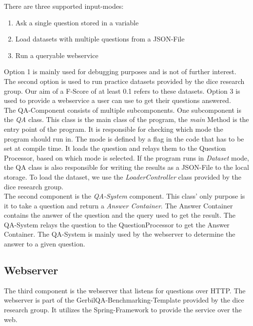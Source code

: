 \documentclass[runningheads]{llncs}
\begin{document}
There are three supported input-modes:  

\begin{enumerate}
	\item Ask a single question stored in a variable
	\item Load datasets with multiple questions from a JSON-File 
	\item Run a queryable webservice 
\end{enumerate}

Option 1 is mainly used for debugging purposes and is not of further interest. The second option is used to run practice datasets provided by the dice research group. Our aim of a F-Score of at least 0.1 refers to these datasets. Option 3 is used to provide a webservice a user can use to get their questions answered. \\

The QA-Component consists of multiple subcomponents. One subcomponent is the \emph{QA} class. This class is the main class of the program, the \emph{main} Method is the entry point of the program. It is responsible for checking which mode the program should run in. The mode is defined by a flag in the code that has to be set at compile time. It loads the question and relays them to the Question Processor, based on which mode is selected. If the program runs in \emph{Dataset} mode, the QA class is also responsible for writing the results as a JSON-File to the local storage. To load the dataset, we use the \emph{LoaderController} class provided by the dice research group. \\

The second component is the \emph{QA-System} component. This class' only purpose is it to take a question and return a \emph{Answer Container}. The Answer Container contains the answer of the question and the query used to get the result. The QA-System relays the question to the QuestionProcessor to get the Answer Container. The QA-System is mainly used by the webserver to determine the answer to a given question. \\

\subsection{Webserver}

The third component is the webserver that listens for questions over HTTP. The webserver is part of the GerbilQA-Benchmarking-Template provided by the dice research group. It utilizes the Spring-Framework to provide the service over the web. \\
\end{document}
